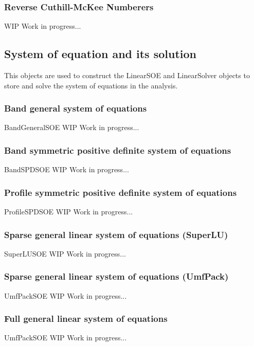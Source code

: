\subsubsection{Reverse Cuthill-McKee Numberers}
WIP Work in progress...



\subsection{System of equation and its solution}
This objects are used to construct the LinearSOE and LinearSolver objects to store and solve the system of equations in the analysis.

\subsubsection{Band general system of equations}
BandGeneralSOE WIP Work in progress...

\subsubsection{Band symmetric positive definite system of equations}
BandSPDSOE WIP Work in progress...

\subsubsection{Profile symmetric positive definite system of equations}
ProfileSPDSOE WIP Work in progress...

\subsubsection{Sparse general linear system of equations (SuperLU)}
SuperLUSOE WIP Work in progress...

\subsubsection{Sparse general linear system of equations (UmfPack)}
UmfPackSOE WIP Work in progress...

\subsubsection{Full general linear system of equations}
UmfPackSOE WIP Work in progress...

